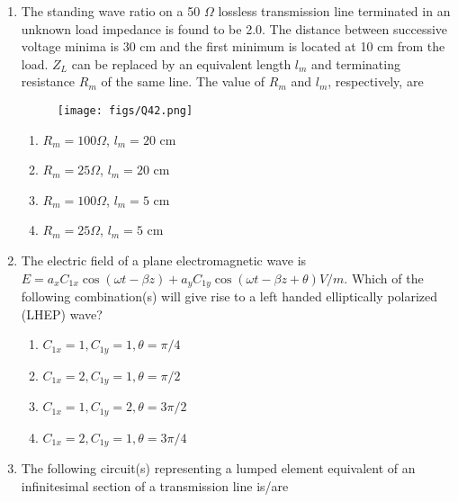 \documentclass[a4paper, 11pt]{article}
\begin{document}
\begin{enumerate}
    \hfill{}

    \item The standing wave ratio on a 50 $\Omega$ lossless transmission line terminated in an unknown load impedance is found to be 2.0. The distance between successive voltage minima is 30 cm and the first minimum is located at 10 cm from the load. $Z_L$ can be replaced by an equivalent length $l_m$ and terminating resistance $R_m$ of the same line. The value of $R_m$ and $l_m$, respectively, are
    \begin{figure}[H]
        \centering
        \texttt{[image: figs/Q42.png]}
        \caption*{}
        \label{fig:q52}
    \end{figure}
    
    \begin{enumerate}
        \item $R_m = 100 \Omega$, $l_m = 20$ cm
        \item $R_m = 25 \Omega$, $l_m = 20$ cm
        \item $R_m = 100 \Omega$, $l_m = 5$ cm
        \item $R_m = 25 \Omega$, $l_m = 5$ cm
    \end{enumerate}
    
    \hfill{}
    
    \item The electric field of a plane electromagnetic wave is
    $E = a_x C_{1x} \cos(\omega t - \beta z) + a_y C_{1y} \cos(\omega t - \beta z + \theta) V/m$.
    Which of the following combination(s) will give rise to a left handed elliptically polarized (LHEP) wave?
    
    \begin{enumerate}
        \item $C_{1x}=1, C_{1y}=1, \theta=\pi/4$
        \item $C_{1x}=2, C_{1y}=1, \theta=\pi/2$
        \item $C_{1x}=1, C_{1y}=2, \theta=3\pi/2$
        \item $C_{1x}=2, C_{1y}=1, \theta=3\pi/4$
    \end{enumerate}

    \hfill{}
    
    \item The following circuit(s) representing a lumped element equivalent of an infinitesimal section of a transmission line is/are
    

\end{enumerate}
\end{document}
